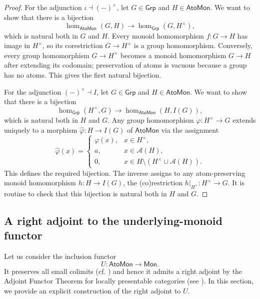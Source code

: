 \documentclass[a4paper,10pt,reqno]{amsart}
\theoremstyle{definition}
\theoremstyle{remark}
\newcommand{\AtoMon}{\mathsf{AtoMon}}
\newcommand{\Mon}{\mathsf{Mon}}
\newcommand{\Grp}{\mathsf{Grp}}
\newcommand{\A}{\mathscr A}
\newcommand{\Hom}{\operatorname{hom}}
\begin{document}

\begin{proof}
For the adjunction $\iota\dashv(-)^\times$, let $G\in\Grp$ and $H\in\AtoMon$. We want to show that there is a bijection
$$
\hom_\AtoMon(G, H) \to \hom_{\mathsf{Grp}}(G,H^\times),
$$
which is natural both in $G$ and $H$. Every monoid homomorphism $f:G\to H$ has image in $H^\times$, so its corestriction $G \to H^\times$ is a group homomorphism. Conversely, every group homomorphism $G\to H^\times$ becomes a monoid homomorphism $G\to H$ after extending its codomain; preservation of atoms is vacuous because a group has no atoms. This gives the first natural bijection.

For the adjunction $(-)^\times\dashv I$, let $G\in\Grp$ and $H\in\AtoMon$. We want to show that there is a bijection
$$
\hom_{\mathsf{Grp}}(H^\times, G) \to \hom_\AtoMon(H, I(G)),
$$
which is natural both in $H$ and $G$. Any group homomorphism $\varphi \colon H^\times \to G$ extends uniquely to a morphism $\hat{\varphi}\colon H\to I(G)$ of $\AtoMon$ via the assignment
$$
 \hat{\varphi}(x)=
 \begin{cases}
   \varphi(x),&x\in H^\times,\\
   a,&x\in\A(H),\\
   0,&x\in H\setminus(H^\times\cup\A(H)).
 \end{cases}
$$
This defines the required bijection. The inverse assigns to any atom-preserving monoid homomorphism $h\colon H \to I(G)$, the (co)restriction $h|_{H^\times}\colon H^\times \to G$. It is routine to check that this bijection is natural both in $H$ and $G$.
\end{proof}


\subsection{A right adjoint to the underlying-monoid functor}\label{subsec:atomization}

Let us consider the inclusion functor
$$
 U:\AtoMon\to\Mon.
$$
It preserves all small colimits (cf. \cite[Theorem~6.3]{CCT}) and hence it admits a right adjoint by the Adjoint Functor Theorem for locally presentable categories (see \cite[Theorem~1.66]{AR}). In this section, we provide an explicit construction of the right adjoint to $U$.
\end{document}
